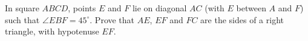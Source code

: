 In square $ABCD$, points $E$ and $F$ lie on diagonal $AC$ (with $E$ between $A$ and $F$) such that $\angle EBF=45^\circ$. Prove that $AE$, $EF$ and $FC$ are the sides of a right triangle, with hypotenuse $EF$.
